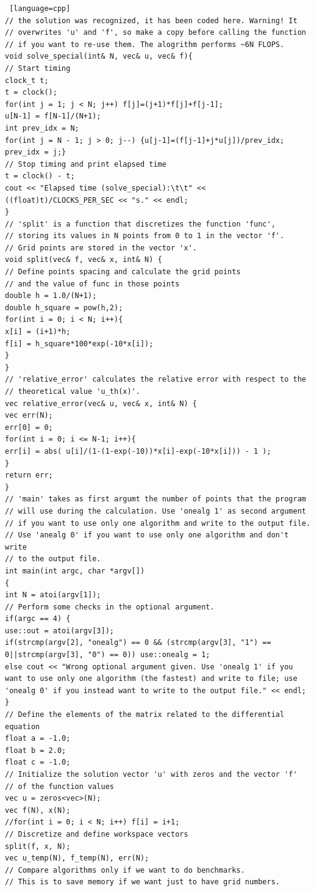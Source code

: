 \documentclass {article}
\begin{document}
\begin{lstlisting} [language=cpp]
// the solution was recognized, it has been coded here. Warning! It
// overwrites 'u' and 'f', so make a copy before calling the function
// if you want to re-use them. The alogrithm performs ~6N FLOPS.
void solve_special(int& N, vec& u, vec& f){
// Start timing
clock_t t;
t = clock();
for(int j = 1; j < N; j++) f[j]=(j+1)*f[j]+f[j-1];
u[N-1] = f[N-1]/(N+1);
int prev_idx = N;
for(int j = N - 1; j > 0; j--) {u[j-1]=(f[j-1]+j*u[j])/prev_idx; prev_idx = j;}
// Stop timing and print elapsed time
t = clock() - t;
cout << "Elapsed time (solve_special):\t\t" << ((float)t)/CLOCKS_PER_SEC << "s." << endl;
}
// 'split' is a function that discretizes the function 'func',
// storing its values in N points from 0 to 1 in the vector 'f'.
// Grid points are stored in the vector 'x'.
void split(vec& f, vec& x, int& N) {
// Define points spacing and calculate the grid points
// and the value of func in those points
double h = 1.0/(N+1);
double h_square = pow(h,2);
for(int i = 0; i < N; i++){
x[i] = (i+1)*h;
f[i] = h_square*100*exp(-10*x[i]);
}
}
// 'relative_error' calculates the relative error with respect to the
// theoretical value 'u_th(x)'.
vec relative_error(vec& u, vec& x, int& N) {
vec err(N);
err[0] = 0;
for(int i = 0; i <= N-1; i++){
err[i] = abs( u[i]/(1-(1-exp(-10))*x[i]-exp(-10*x[i])) - 1 );
}
return err;
}
// 'main' takes as first argumt the number of points that the program
// will use during the calculation. Use 'onealg 1' as second argument
// if you want to use only one algorithm and write to the output file.
// Use 'anealg 0' if you want to use only one algorithm and don't write
// to the output file.
int main(int argc, char *argv[])
{
int N = atoi(argv[1]);
// Perform some checks in the optional argument.
if(argc == 4) {
use::out = atoi(argv[3]);
if(strcmp(argv[2], "onealg") == 0 && (strcmp(argv[3], "1") == 0||strcmp(argv[3], "0") == 0)) use::onealg = 1;
else cout << "Wrong optional argument given. Use 'onealg 1' if you want to use only one algorithm (the fastest) and write to file; use 'onealg 0' if you instead want to write to the output file." << endl;
}
// Define the elements of the matrix related to the differential equation
float a = -1.0;
float b = 2.0;
float c = -1.0;
// Initialize the solution vector 'u' with zeros and the vector 'f'
// of the function values
vec u = zeros<vec>(N);
vec f(N), x(N);
//for(int i = 0; i < N; i++) f[i] = i+1;
// Discretize and define workspace vectors
split(f, x, N);
vec u_temp(N), f_temp(N), err(N);
// Compare algorithms only if we want to do benchmarks.
// This is to save memory if we want just to have grid numbers.

\end{lstlisting}
\end{document}
